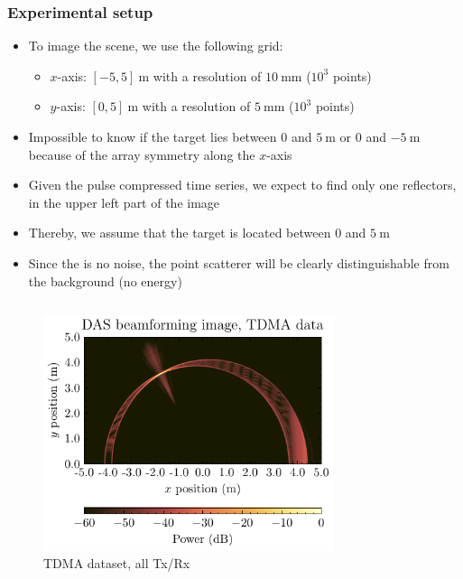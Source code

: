 \documentclass[UKenglish,8pt,aspectratio=1610]{beamer}
\begin{document}
\begin{frame}
	\frametitle{Experimental setup}
\begin{itemize}
	\item To image the scene, we use the following grid:
	\begin{itemize}
		\item $x$-axis: $[-5,5]~\si{\meter}$ with a resolution of $10~\si{\milli\meter}$ ($10^{3}$ points)
		\item $y$-axis: $[0,5]~\si{\meter}$ with a resolution of $5~\si{\milli\meter}$ ($10^{3}$ points)
	\end{itemize} 
\item Impossible to know if the target lies between $0$ and $5~\si{\meter}$ or $0$ and $-5~\si{\meter}$ because of the array symmetry along the $x$-axis
\item Given the pulse compressed time series, we expect to find only one reflectors, in the upper left part of the image
\item Thereby, we assume that the target is located between $0$ and $5~\si{\meter}$
\item Since the is no noise, the point scatterer will be clearly distinguishable from the background (no energy)
\end{itemize}
\begin{columns}
	\begin{column}{0.5\textwidth}
		\begin{figure}[h!]
			\includegraphics[width=0.8\textwidth]{question3/TDMA_DAS_image.pdf}
			\centering
			\caption{TDMA dataset, all Tx/Rx}
		\end{figure}
	\end{column}
	\begin{column}{0.5\textwidth}

\end{column}
\end{columns}
\end{frame}
\end{document}
